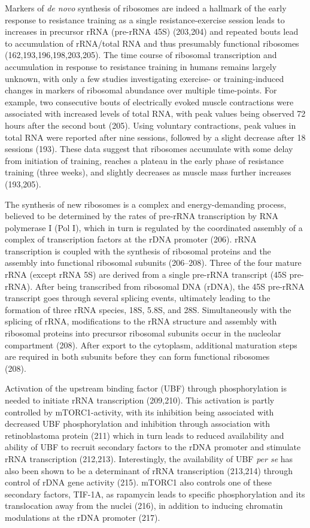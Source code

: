 \documentclass[twoside,10pt]{gihclass} %
\begin{document}
Markers of \emph{de novo} synthesis of ribosomes are indeed a hallmark of the early response to resistance training as a single resistance-exercise session leads to increases in precursor rRNA (pre-rRNA 45S)
(203,204)
and repeated bouts lead to accumulation of rRNA/total RNA and thus presumably functional ribosomes
(162,193,196,198,203,205).
The time course of ribosomal transcription and accumulation in response to resistance training in humans remains largely unknown, with only a few studies investigating exercise- or training-induced changes in markers of ribosomal abundance over multiple time-points.
For example, two consecutive bouts of electrically evoked muscle contractions were associated with increased levels of total RNA, with peak values being observed 72 hours after the second bout
(205).
Using voluntary contractions, peak values in total RNA were reported after nine sessions, followed by a slight decrease after 18 sessions (193).
These data suggest that ribosomes accumulate with some delay from initiation of training, reaches a plateau in the early phase of resistance training (three weeks), and slightly decreases as muscle mass further increases
(193,205).

The synthesis of new ribosomes is a complex and energy-demanding process, believed to be determined by the rates of pre-rRNA transcription by RNA polymerase I (Pol I), which in turn is regulated by the coordinated assembly of a complex of transcription factors at the rDNA promoter
(206).
rRNA transcription is coupled with the synthesis of ribosomal proteins and the assembly into functional ribosomal subunits
(206--208).
Three of the four mature rRNA (except rRNA 5S) are derived from a single pre-rRNA transcript (45S pre-rRNA). After being transcribed from ribosomal DNA (rDNA), the 45S pre-rRNA transcript goes through several splicing events, ultimately leading to the formation of three rRNA species, 18S, 5.8S, and 28S. Simultaneously with the splicing of rRNA, modifications to the rRNA structure and assembly with ribosomal proteins into precursor ribosomal subunits occur in the nucleolar compartment
(208).
After export to the cytoplasm, additional maturation steps are required in both subunits before they can form functional ribosomes\\
(208).

Activation of the upstream binding factor (UBF) through phosphorylation is needed to initiate rRNA transcription
(209,210).
This activation is partly controlled by mTORC1-activity, with its inhibition being associated with decreased UBF phosphorylation and inhibition through association with retinoblastoma protein
(211)
which in turn leads to reduced availability and ability of UBF to recruit secondary factors to the rDNA promoter and stimulate rRNA transcription
(212,213).
Interestingly, the availability of UBF \emph{per se} has also been shown to be a determinant of rRNA transcription
(213,214)
through control of rDNA gene activity
(215).
mTORC1 also controls one of these secondary factors, TIF-1A, as rapamycin leads to specific phosphorylation and its translocation away from the nuclei
(216),
in addition to inducing chromatin modulations at the rDNA promoter
(217).
\end{document}
